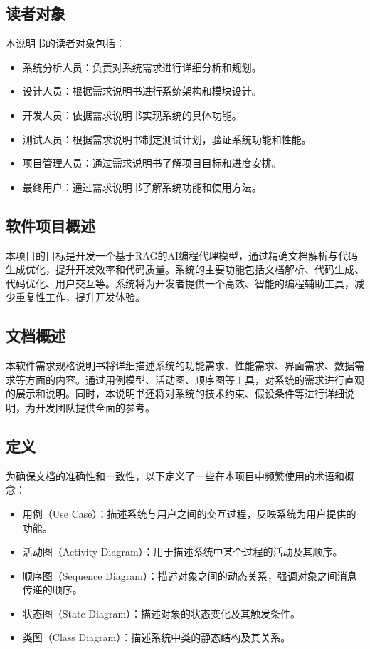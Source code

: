 \documentclass[
    report,     %
    oneside,    %
    UTF8,       %
    zihao=-4    %
]{config} %
\begin{document}
\subsection{读者对象}
本说明书的读者对象包括：
\begin{itemize}
    \item 系统分析人员：负责对系统需求进行详细分析和规划。
    \item 设计人员：根据需求说明书进行系统架构和模块设计。
    \item 开发人员：依据需求说明书实现系统的具体功能。
    \item 测试人员：根据需求说明书制定测试计划，验证系统功能和性能。
    \item 项目管理人员：通过需求说明书了解项目目标和进度安排。
    \item 最终用户：通过需求说明书了解系统功能和使用方法。
\end{itemize}

\subsection{软件项目概述}
本项目的目标是开发一个基于RAG的AI编程代理模型，通过精确文档解析与代码生成优化，提升开发效率和代码质量。系统的主要功能包括文档解析、代码生成、代码优化、用户交互等。系统将为开发者提供一个高效、智能的编程辅助工具，减少重复性工作，提升开发体验。

\subsection{文档概述}
本软件需求规格说明书将详细描述系统的功能需求、性能需求、界面需求、数据需求等方面的内容。通过用例模型、活动图、顺序图等工具，对系统的需求进行直观的展示和说明。同时，本说明书还将对系统的技术约束、假设条件等进行详细说明，为开发团队提供全面的参考。

\subsection{定义}
为确保文档的准确性和一致性，以下定义了一些在本项目中频繁使用的术语和概念：
\begin{itemize}
    \item 用例（Use Case）：描述系统与用户之间的交互过程，反映系统为用户提供的功能。
    \item 活动图（Activity Diagram）：用于描述系统中某个过程的活动及其顺序。
    \item 顺序图（Sequence Diagram）：描述对象之间的动态关系，强调对象之间消息传递的顺序。
    \item 状态图（State Diagram）：描述对象的状态变化及其触发条件。
    \item 类图（Class Diagram）：描述系统中类的静态结构及其关系。
\end{itemize}
\end{document}
